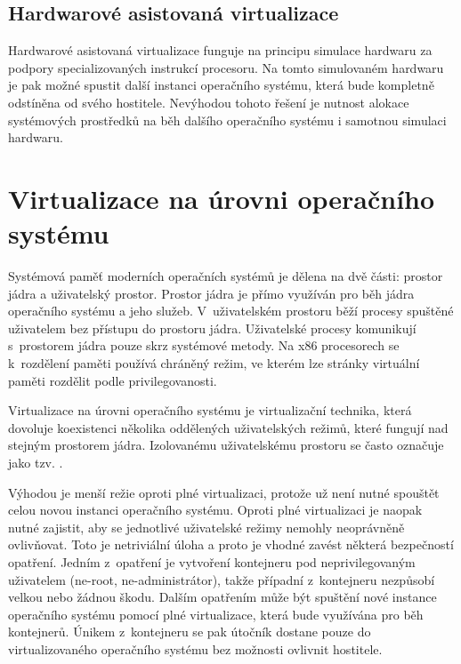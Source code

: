 \subsection{Hardwarové asistovaná virtualizace}

Hardwarové asistovaná virtualizace funguje na principu simulace hardwaru za podpory specializovaných instrukcí procesoru.
Na tomto simulovaném hardwaru je pak možné spustit další instanci operačního systému, která bude kompletně odstíněna od svého hostitele.
Nevýhodou tohoto řešení je nutnost alokace systémových prostředků na běh dalšího operačního systému i samotnou simulaci hardwaru.

\section{Virtualizace na úrovni operačního systému}

Systémová paměť moderních operačních systémů je dělena na dvě části: prostor jádra a uživatelský prostor.
Prostor jádra je přímo využíván pro běh jádra operačního systému a jeho služeb.
V~uživatelském prostoru běží procesy spuštěné uživatelem bez přístupu do prostoru jádra.
Uživatelské procesy komunikují s~prostorem jádra pouze skrz systémové metody.
Na x86 procesorech se k~rozdělení paměti používá chráněný režim, ve kterém lze stránky virtuální paměti rozdělit podle privilegovanosti.

Virtualizace na úrovni operačního systému je virtualizační technika, která dovoluje koexistenci několika oddělených uživatelských režimů, které fungují nad stejným prostorem jádra.
Izolovanému uživatelskému prostoru se často označuje jako tzv. .

Výhodou je menší režie oproti plné virtualizaci, protože už není nutné spouštět celou novou instanci operačního systému.
Oproti plné virtualizaci je naopak nutné zajistit, aby se jednotlivé uživatelské režimy nemohly neoprávněně ovlivňovat.
Toto je netriviální úloha a proto je vhodné zavést některá bezpečností opatření.
Jedním z~opatření je vytvoření kontejneru pod neprivilegovaným uživatelem (ne-root, ne-administrátor), takže případní  z~kontejneru nezpůsobí velkou nebo žádnou škodu.
Dalším opatřením může být spuštění nové instance operačního systému pomocí plné virtualizace, která bude využívána pro běh kontejnerů.
Únikem z~kontejneru se pak útočník dostane pouze do virtualizovaného operačního systému bez možnosti ovlivnit hostitele.

